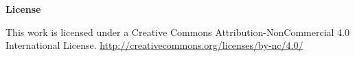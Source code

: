 \documentclass[11pt]{article}
\begin{document}
{\centering \Huge \textbf{License} \par}
\vspace{1cm} %
\noindent This work is licensed under a Creative Commons Attribution-NonCommercial 4.0 International License. \newline
\url{http://creativecommons.org/licenses/by-nc/4.0/}
\pagebreak



\tableofcontents
\pagebreak









\printbibliography  %
\end{document}
